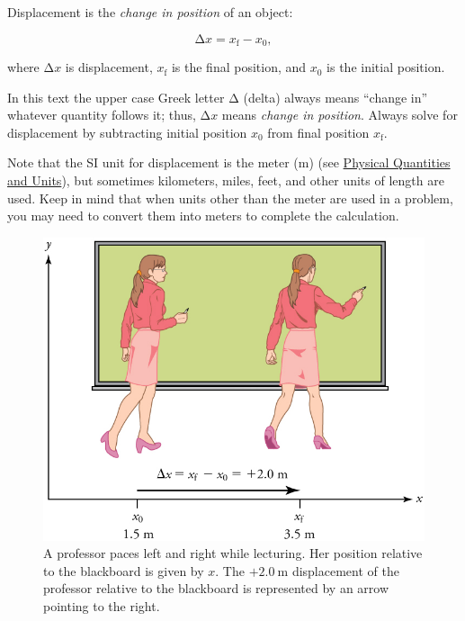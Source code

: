 \documentclass[
]{book}
\begin{document}
Displacement is the \emph{change in position} of an object:

\leavevmode{}%
\[{\text{Δ}x = {x_{\text{f}} - x_{0}},}{}\]

where \({\text{Δ}x}{}\) is displacement, \(x_{\text{f}}{}\) is the final
position, and \emph{}\(x_{0}{}\) is the initial
position.

In this text the upper case Greek letter \(\text{Δ}{}\) (delta) always
means ``change in'' whatever quantity follows it; thus, \({\text{Δ}x}{}\)
means \emph{change in position}. Always solve for displacement by subtracting
initial position \(x_{0}{}\) from final position \(x_{\text{f}}{}\).

Note that the SI unit for displacement is the meter (m) (see \href{/m54765}{Physical
Quantities and Units}), but sometimes kilometers, miles, feet,
and other units of length are used. Keep in mind that when units other
than the meter are used in a problem, you may need to convert them into
meters to complete the calculation.

\begin{figure}
\hypertarget{import-auto-id2972079}{%
\centering
\includegraphics{images/Figure_02_01_01.jpg}
\caption{A professor paces left and right while lecturing. Her position
relative to the blackboard is given by \(x{}\). The
\({{+ 2}\text{.}0\ \text{m}}{}\) displacement of the professor relative to
the blackboard is represented by an arrow pointing to the
right.}\label{import-auto-id2972079}
}
\end{figure}
\end{document}
